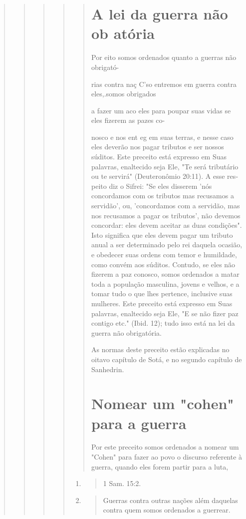 \begin{quote}
\begin{quote}
\begin{quote}
\begin{quote}
\begin{quote}
\section{A lei da guerra não ob atória}

Por eito somos ordenados quanto a guerras não obrigató-

rias contra naç C'so entremos em guerra contra eles,.somos obrigados

a fazer um aco eles para poupar suas vidas se eles fizerem as pazes co-

nosco e nos ent eg em suas terras, e nesse caso eles deverão nos pagar
tribu­tos e ser nossos súditos. Este preceito está expresso em Suas
palavras, enalteci­do seja Ele, "Te será tributário ou te servirá"
(Deuteronômio 20:11). A esse res­peito diz o Sifrei: "Se eles disserem
'nós concordamos com os tributos mas re­cusamos a servidão', ou,
'concordamos com a servidão, mas nos recusamos a pagar os tributos', não
devemos concordar: eles devem aceitar as duas condi­ções". Isto
significa que eles devem pagar um tributo anual a ser determinado pelo
rei daquela ocasião, e obedecer suas ordens com temor e humildade, co­mo
convém aos súditos. Contudo, se eles não fizerem a paz conosco, somos
ordenados a matar toda a população masculina, jovens e velhos, e a tomar
tudo o que lhes pertence, inclusive suas mulheres. Este preceito está
expresso em Suas palavras, enaltecido seja Ele, "E se não fizer paz
contigo etc." (Ibid. 12); tudo isso está na lei da guerra não
obrigatória.

As normas deste preceito estão explicadas no oitavo capítulo de So­tá, e
no segundo capítulo de Sanhedrin.

\section{Nomear um "cohen" para a guerra}

Por este preceito somos ordenados a nomear um "Cohen" para fa­zer ao
povo o discurso referente à guerra, quando eles forem partir para a
luta,
\end{quote}

\begin{enumerate}
\def\labelenumi{\arabic{enumi}.}
\setcounter{enumi}{194}
\item
 \begin{quote}
 1 Sam. 15:2.
 \end{quote}
\item
 \begin{quote}
 Guerras contra outras nações além daquelas contra quem somos ordenados
 a guerrear.
 \end{quote}
\end{enumerate}


\end{quote}
\end{quote}
\end{quote}
\end{quote}
